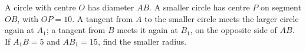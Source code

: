 A circle with centre $ O $ has diameter $ AB $. A smaller circle has centre $ P $ on segment $ OB $, with $ OP=10 $. A tangent from $ A $ to the smaller circle meets the larger circle again at $ A_1 $; a tangent from $ B $ meets it again at $ B_1 $, on the opposite side of $ AB $. If $ A_1B=5 $ and $ AB_1=15 $, find the smaller radius.
